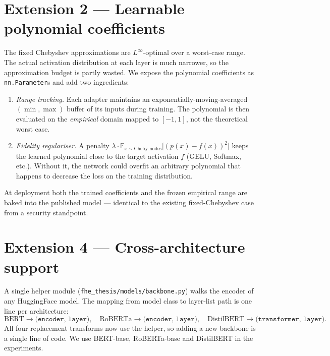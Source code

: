 \documentclass[11pt,a4paper]{article}
\begin{document}
\section{Extension 2 --- Learnable polynomial coefficients}

The fixed Chebyshev approximations are $L^\infty$-optimal over a
worst-case range. The actual activation distribution at each layer is
much narrower, so the approximation budget is partly wasted. We
expose the polynomial coefficients as \texttt{nn.Parameter}s and add
two ingredients:

\begin{enumerate}
    \item \emph{Range tracking.} Each adapter maintains an
    exponentially-moving-averaged $(\min, \max)$ buffer of its inputs
    during training. The polynomial is then evaluated on the
    \emph{empirical} domain mapped to $[-1, 1]$, not the theoretical
    worst case.
    \item \emph{Fidelity regulariser.} A penalty
    $\lambda \cdot \mathbb{E}_{x \sim \text{Cheby nodes}}\bigl[(p(x) - f(x))^2\bigr]$
    keeps the learned polynomial close to the target activation $f$
    (GELU, Softmax, etc.). Without it, the network could overfit an
    arbitrary polynomial that happens to decrease the loss on the
    training distribution.
\end{enumerate}

At deployment both the trained coefficients and the frozen empirical
range are baked into the published model — identical to the existing
fixed-Chebyshev case from a security standpoint.

\section{Extension 4 --- Cross-architecture support}

A single helper module (\texttt{fhe\_thesis/models/backbone.py})
walks the encoder of any HuggingFace model. The mapping from model
class to layer-list path is one line per architecture:
\[
\text{BERT} \to \texttt{(encoder, layer)}, \quad
\text{RoBERTa} \to \texttt{(encoder, layer)}, \quad
\text{DistilBERT} \to \texttt{(transformer, layer)}.
\]
All four replacement transforms now use the helper, so adding a new
backbone is a single line of code. We use BERT-base, RoBERTa-base and
DistilBERT in the experiments.
\end{document}
